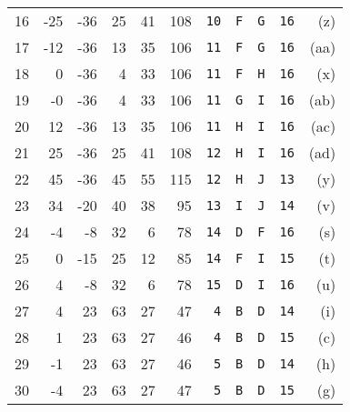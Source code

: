 \documentclass[10pt,a4paper]{article}
\begin{document}
\begin{table}[tbh]
\begin{center}
\begin{threeparttable}
\begin{tabular}{r|rr|rrr|rrrr|r}
					\rowcolor{DScol16!25} 16 & -25 & -36 & 25 & 41 & 108 & \texttt{10} & \texttt{F} & \texttt{G} & \texttt{16} &  (z) \\
					\rowcolor{DScol17!25} 17 & -12 & -36 & 13 & 35 & 106 & \texttt{11} & \texttt{F} & \texttt{G} & \texttt{16} & (aa) \\
					\rowcolor{DScol18!25} 18 &  0 & -36 &  4 & 33 & 106 & \texttt{11} & \texttt{F} & \texttt{H} & \texttt{16} &  (x) \\
					\rowcolor{DScol19!25} 19 & -0 & -36 &  4 & 33 & 106 & \texttt{11} & \texttt{G} & \texttt{I} & \texttt{16} & (ab) \\
					\rowcolor{DScol20!25} 20 & 12 & -36 & 13 & 35 & 106 & \texttt{11} & \texttt{H} & \texttt{I} & \texttt{16} & (ac) \\
					\rowcolor{DScol21!25} 21 & 25 & -36 & 25 & 41 & 108 & \texttt{12} & \texttt{H} & \texttt{I} & \texttt{16} & (ad) \\
					\rowcolor{DScol22!25} 22 & 45 & -36 & 45 & 55 & 115 & \texttt{12} & \texttt{H} & \texttt{J} & \texttt{13} &  (y) \\
					\rowcolor{DScol23!25} 23 & 34 & -20 & 40 & 38 & 95 & \texttt{13} & \texttt{I} & \texttt{J} & \texttt{14} &  (v) \\
					\rowcolor{DScol24!25} 24 & -4 & -8 & 32 &  6 & 78 & \texttt{14} & \texttt{D} & \texttt{F} & \texttt{16} &  (s) \\
					\rowcolor{DScol25!25} 25 &  0 & -15 & 25 & 12 & 85 & \texttt{14} & \texttt{F} & \texttt{I} & \texttt{15} &  (t) \\
					\rowcolor{DScol26!25} 26 &  4 & -8 & 32 &  6 & 78 & \texttt{15} & \texttt{D} & \texttt{I} & \texttt{16} &  (u) \\
					\rowcolor{DScol27!25} 27 &  4 & 23 & 63 & 27 & 47 & \texttt{ 4} & \texttt{B} & \texttt{D} & \texttt{14} &  (i) \\
					\rowcolor{DScol28!25} 28 &  1 & 23 & 63 & 27 & 46 & \texttt{ 4} & \texttt{B} & \texttt{D} & \texttt{15} &  (c) \\
					\rowcolor{DScol29!25} 29 & -1 & 23 & 63 & 27 & 46 & \texttt{ 5} & \texttt{B} & \texttt{D} & \texttt{14} &  (h) \\
					\rowcolor{DScol30!25} 30 & -4 & 23 & 63 & 27 & 47 & \texttt{ 5} & \texttt{B} & \texttt{D} & \texttt{15} &  (g) \\
				\end{tabular}
				\begin{tablenotes}
					\item 
				\end{tablenotes}
			\end{threeparttable}
		\end{center}
	\end{table}
\end{document}
